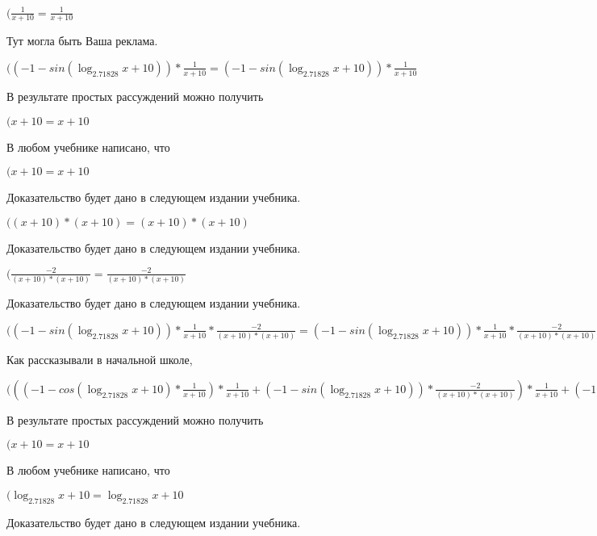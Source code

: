 \documentclass[12pt,a4paper,fleqn]{article}
\theoremstyle{definition}
\begin{document}
$(\frac{ 1 }{ x  +  10 }
 = \frac{ 1 }{ x  +  10 }
$

Тут могла быть Ваша реклама.

$(( -1  - sin(\log_{ 2.71828 }{ x  +  10 })) * \frac{ 1 }{ x  +  10 }
 = ( -1  - sin(\log_{ 2.71828 }{ x  +  10 })) * \frac{ 1 }{ x  +  10 }
$

В результате простых рассуждений можно получить

$( x  +  10  =  x  +  10 $

В любом учебнике написано, что

$( x  +  10  =  x  +  10 $

Доказательство будет дано в следующем издании учебника.

$(( x  +  10 ) * ( x  +  10 ) = ( x  +  10 ) * ( x  +  10 )$

Доказательство будет дано в следующем издании учебника.

$(\frac{ -2 }{( x  +  10 ) * ( x  +  10 )}
 = \frac{ -2 }{( x  +  10 ) * ( x  +  10 )}
$

Доказательство будет дано в следующем издании учебника.

$(( -1  - sin(\log_{ 2.71828 }{ x  +  10 })) * \frac{ 1 }{ x  +  10 }
 * \frac{ -2 }{( x  +  10 ) * ( x  +  10 )}
 = ( -1  - sin(\log_{ 2.71828 }{ x  +  10 })) * \frac{ 1 }{ x  +  10 }
 * \frac{ -2 }{( x  +  10 ) * ( x  +  10 )}
$

Как рассказывали в начальной школе,

$((( -1  - cos(\log_{ 2.71828 }{ x  +  10 }) * \frac{ 1 }{ x  +  10 }
) * \frac{ 1 }{ x  +  10 }
 + ( -1  - sin(\log_{ 2.71828 }{ x  +  10 })) * \frac{ -2 }{( x  +  10 ) * ( x  +  10 )}
) * \frac{ 1 }{ x  +  10 }
 + ( -1  - sin(\log_{ 2.71828 }{ x  +  10 })) * \frac{ 1 }{ x  +  10 }
 * \frac{ -2 }{( x  +  10 ) * ( x  +  10 )}
 = (( -1  - cos(\log_{ 2.71828 }{ x  +  10 }) * \frac{ 1 }{ x  +  10 }
) * \frac{ 1 }{ x  +  10 }
 + ( -1  - sin(\log_{ 2.71828 }{ x  +  10 })) * \frac{ -2 }{( x  +  10 ) * ( x  +  10 )}
) * \frac{ 1 }{ x  +  10 }
 + ( -1  - sin(\log_{ 2.71828 }{ x  +  10 })) * \frac{ 1 }{ x  +  10 }
 * \frac{ -2 }{( x  +  10 ) * ( x  +  10 )}
$

В результате простых рассуждений можно получить

$( x  +  10  =  x  +  10 $

В любом учебнике написано, что

$(\log_{ 2.71828 }{ x  +  10 } = \log_{ 2.71828 }{ x  +  10 }$

Доказательство будет дано в следующем издании учебника.
\end{document}

